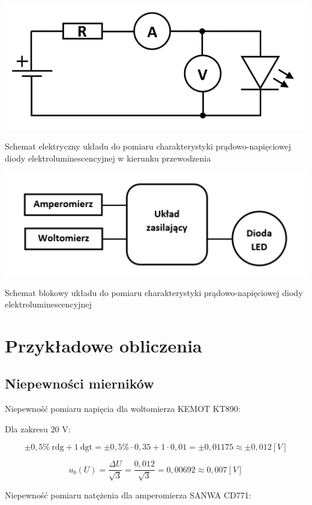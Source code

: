 \documentclass[12pt]{article}
\begin{document}
\begin{center}
    \includegraphics[scale=0.5]{uklad1.png}

    Schemat elektryczny układu do pomiaru charakterystyki prądowo-napięciowej
    diody elektroluminescencyjnej w kierunku przewodzenia

    \includegraphics[scale=0.5]{uklad2.png}

    Schemat blokowy układu do pomiaru charakterystyki prądowo-napięciowej
    diody elektroluminescencyjnej
\end{center}

\section{Przykładowe obliczenia}

\subsection{Niepewności mierników}

Niepewność pomiaru napięcia dla woltomierza KEMOT KT890:

Dla zakresu 20 V:

\[ \pm 0,5\% \ \textrm{rdg} + 1 \ \textrm{dgt} = \pm 0,5\% \cdot 0,35 + 1 \cdot 0,01 = \pm 0,01175 \approx \pm 0,012[V] \]

\[ u_b(U) = \frac{\Delta U}{\sqrt{3}} = \frac{0,012}{\sqrt{3}} = 0,00692 \approx 0,007[V] \] \bigskip

Niepewność pomiaru natężenia dla amperomierza SANWA CD771:
\end{document}
